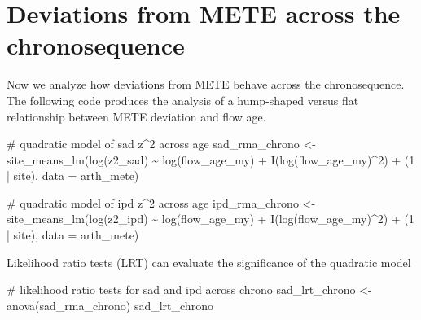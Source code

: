 \documentclass[
  letterpaper,
  DIV=11,
  numbers=noendperiod]{scrartcl}
\newenvironment{Shaded}{\begin{snugshade}}{\end{snugshade}}
\newcommand{\AttributeTok}[1]{\textcolor[rgb]{0.40,0.45,0.13}{#1}}
\newcommand{\CommentTok}[1]{\textcolor[rgb]{0.37,0.37,0.37}{#1}}
\newcommand{\DecValTok}[1]{\textcolor[rgb]{0.68,0.00,0.00}{#1}}
\newcommand{\FunctionTok}[1]{\textcolor[rgb]{0.28,0.35,0.67}{#1}}
\newcommand{\NormalTok}[1]{\textcolor[rgb]{0.00,0.23,0.31}{#1}}
\newcommand{\OtherTok}[1]{\textcolor[rgb]{0.00,0.23,0.31}{#1}}
\newcommand{\SpecialCharTok}[1]{\textcolor[rgb]{0.37,0.37,0.37}{#1}}
\begin{document}
\section{Deviations from METE across the
chronosequence}\label{deviations-from-mete-across-the-chronosequence}

Now we analyze how deviations from METE behave across the
chronosequence. The following code produces the analysis of a
hump-shaped versus flat relationship between METE deviation and flow
age.

\begin{Shaded}
\begin{Highlighting}[]
\CommentTok{\# quadratic model of sad z\^{}2 across age}
\NormalTok{sad\_rma\_chrono }\OtherTok{\textless{}{-}} \FunctionTok{site\_means\_lm}\NormalTok{(}\FunctionTok{log}\NormalTok{(z2\_sad) }\SpecialCharTok{\textasciitilde{}} 
                                    \FunctionTok{log}\NormalTok{(flow\_age\_my) }\SpecialCharTok{+} \FunctionTok{I}\NormalTok{(}\FunctionTok{log}\NormalTok{(flow\_age\_my)}\SpecialCharTok{\^{}}\DecValTok{2}\NormalTok{) }\SpecialCharTok{+} 
\NormalTok{                                    (}\DecValTok{1} \SpecialCharTok{|}\NormalTok{ site),}
                                \AttributeTok{data =}\NormalTok{ arth\_mete)}

\CommentTok{\# quadratic model of ipd z\^{}2 across age}
\NormalTok{ipd\_rma\_chrono }\OtherTok{\textless{}{-}} \FunctionTok{site\_means\_lm}\NormalTok{(}\FunctionTok{log}\NormalTok{(z2\_ipd) }\SpecialCharTok{\textasciitilde{}} 
                                    \FunctionTok{log}\NormalTok{(flow\_age\_my) }\SpecialCharTok{+} \FunctionTok{I}\NormalTok{(}\FunctionTok{log}\NormalTok{(flow\_age\_my)}\SpecialCharTok{\^{}}\DecValTok{2}\NormalTok{) }\SpecialCharTok{+} 
\NormalTok{                                    (}\DecValTok{1} \SpecialCharTok{|}\NormalTok{ site),}
                                \AttributeTok{data =}\NormalTok{ arth\_mete)}
\end{Highlighting}
\end{Shaded}

Likelihood ratio tests (LRT) can evaluate the significance of the
quadratic model

\begin{Shaded}
\begin{Highlighting}[]
\CommentTok{\# likelihood ratio tests for sad and ipd across chrono}
\NormalTok{sad\_lrt\_chrono }\OtherTok{\textless{}{-}} \FunctionTok{anova}\NormalTok{(sad\_rma\_chrono)}
\NormalTok{sad\_lrt\_chrono}
\end{Highlighting}
\end{Shaded}
\end{document}

